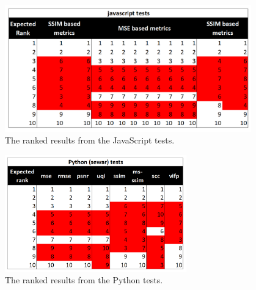 \documentclass[12pt, titlepage]{article}
\begin{document}
\begin{figure}[h!]
  \begin{center}
  \includegraphics[width=0.95\textwidth]{test-analysis/js-ranked.png}
  \caption{The ranked results from the JavaScript tests.}
  \label{fig_js_ranks}
  \end{center}
\end{figure}

\begin{figure}[h!]
  \begin{center}
  \includegraphics[width=0.7\textwidth]{test-analysis/py-ranked.png}
  \caption{The ranked results from the Python tests.}
  \label{fig_py_ranks}
  \end{center}
\end{figure}


\newpage
\clearpage
\end{document}
